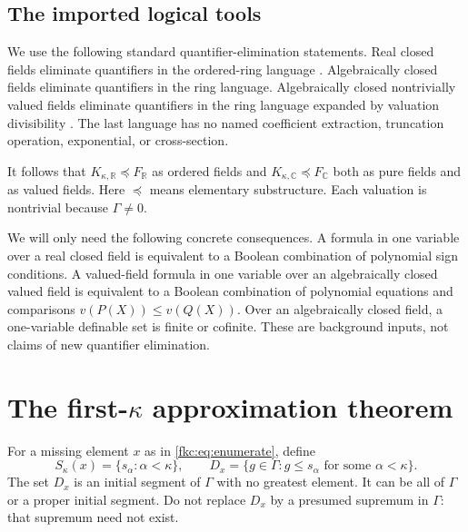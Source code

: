 \documentclass[11pt,letterpaper]{article}
\numberwithin{equation}{section}
\theoremstyle{definition}
\theoremstyle{remark}
\newcommand{\R}{\mathbb R}
\newcommand{\C}{\mathbb C}
\newcommand{\KR}{K_{\kappa,\R}}
\newcommand{\KC}{K_{\kappa,\C}}
\newcommand{\FR}{F_{\R}}
\newcommand{\FC}{F_{\C}}
\begin{document}
\subsection{The imported logical tools}
We use the following standard quantifier-elimination statements. Real closed fields eliminate quantifiers in the ordered-ring language \cite{Tarski}. Algebraically closed fields eliminate quantifiers in the ring language. Algebraically closed nontrivially valued fields eliminate quantifiers in the ring language expanded by valuation divisibility \cite{Robinson,Yin}. The last language has no named coefficient extraction, truncation operation, exponential, or cross-section.

It follows that $\KR\preccurlyeq\FR$ as ordered fields and $\KC\preccurlyeq\FC$ both as pure fields and as valued fields. Here $\preccurlyeq$ means elementary substructure. Each valuation is nontrivial because $\Gamma\ne0$.

We will only need the following concrete consequences. A formula in one variable over a real closed field is equivalent to a Boolean combination of polynomial sign conditions. A valued-field formula in one variable over an algebraically closed valued field is equivalent to a Boolean combination of polynomial equations and comparisons $v(P(X))\le v(Q(X))$. Over an algebraically closed field, a one-variable definable set is finite or cofinite. These are background inputs, not claims of new quantifier elimination.

\section{The first-\texorpdfstring{$\kappa$}{kappa} approximation theorem}
\label{fkc:sec:approx}

For a missing element $x$ as in \eqref{fkc:eq:enumerate}, define
\begin{equation}\label{fkc:eq:D}
 S_\kappa(x)=\{s_\alpha:\alpha<\kappa\},\qquad
 D_x=\{g\in\Gamma:g\le s_\alpha\text{ for some }\alpha<\kappa\}.
\end{equation}
The set $D_x$ is an initial segment of $\Gamma$ with no greatest element. It can be all of $\Gamma$ or a proper initial segment. Do not replace $D_x$ by a presumed supremum in $\Gamma$: that supremum need not exist.
\end{document}
